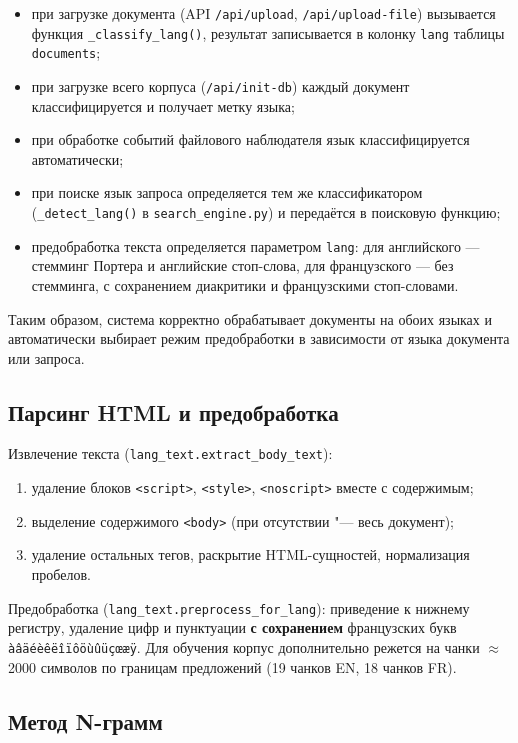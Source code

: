 \begin{itemize}
	\item при загрузке документа (API \texttt{/api/upload}, \texttt{/api/upload-file})
	вызывается функция \texttt{\_classify\_lang()}, результат записывается
	в колонку \texttt{lang} таблицы \texttt{documents};
	\item при загрузке всего корпуса (\texttt{/api/init-db}) каждый документ
	классифицируется и получает метку языка;
	\item при обработке событий файлового наблюдателя язык классифицируется
	автоматически;
	\item при поиске язык запроса определяется тем же классификатором
	(\texttt{\_detect\_lang()} в \texttt{search\_engine.py}) и передаётся
	в поисковую функцию;
	\item предобработка текста определяется параметром \texttt{lang}:
	для английского --- стемминг Портера и английские стоп-слова,
	для французского --- без стемминга, с сохранением диакритики
	и французскими стоп-словами.
\end{itemize}

Таким образом, система корректно обрабатывает документы на обоих языках
и автоматически выбирает режим предобработки в зависимости от языка
документа или запроса.

\subsection{Парсинг HTML и предобработка}

Извлечение текста (\texttt{lang\_text.extract\_body\_text}):

\begin{enumerate}
	\item удаление блоков \texttt{<script>}, \texttt{<style>}, \texttt{<noscript>} вместе с содержимым;
	\item выделение содержимого \texttt{<body>} (при отсутствии "--- весь документ);
	\item удаление остальных тегов, раскрытие HTML-сущностей, нормализация пробелов.
\end{enumerate}

Предобработка (\texttt{lang\_text.preprocess\_for\_lang}): приведение
к нижнему регистру, удаление цифр и пунктуации \textbf{с сохранением}
французских букв \texttt{àâäéèêëîïôöùûüçœæÿ}. Для обучения корпус
дополнительно режется на чанки $\approx$2000 символов по границам
предложений (19 чанков EN, 18 чанков FR).

\subsection{Метод N-грамм}

